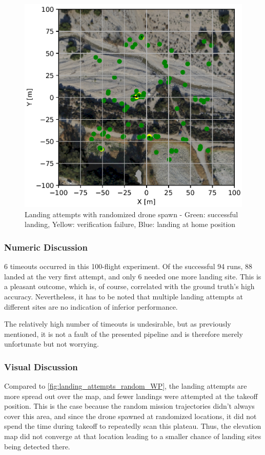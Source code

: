     \begin{figure}[h!]
        \begin{center}
            \includegraphics[scale=0.5]{images/evaluation/landings_complete_randomized_GT.png}
            \caption{Landing attempts with randomized drone spawn - Green: successful landing, Yellow: verification failure, Blue: landing at home position}
            \label{fig:landing_attempts_complete_rand}
        \end{center}
    \end{figure}

    \subsubsection{Numeric Discussion}
    6 timeouts occurred in this 100-flight experiment. Of the successful 94 runs, 88 landed at the very first attempt, and only 6 needed one more landing site. This is a pleasant outcome, which is, of course, correlated with the ground truth's high accuracy. Nevertheless, it has to be noted that multiple landing attempts at different sites are no indication of inferior performance. 

    The relatively high number of timeouts is undesirable, but as previously mentioned, it is not a fault of the presented pipeline and is therefore merely unfortunate but not worrying.


    \subsubsection{Visual Discussion}
    Compared to \cref{fig:landing_attempts_random_WP}, the landing attempts are more spread out over the map, and fewer landings were attempted at the takeoff position. This is the case because the random mission trajectories didn't always cover this area, and since the drone spawned at randomized locations, it did not spend the time during takeoff to repeatedly scan this plateau. Thus, the elevation map did not converge at that location leading to a smaller chance of landing sites being detected there. 
    

